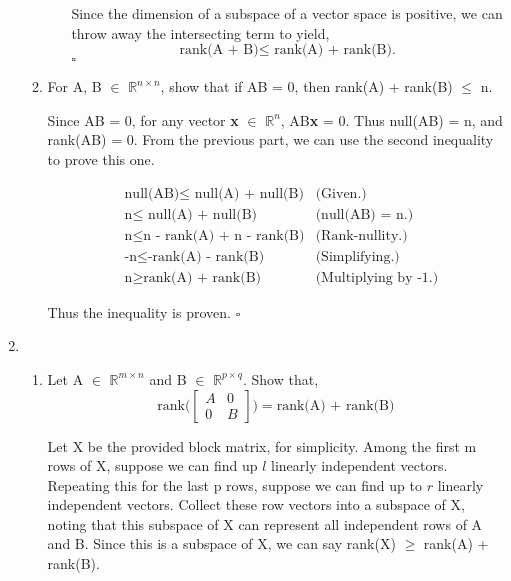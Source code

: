 \documentclass[12pt]{article}
\newcommand{\hop}{\vspace{1mm}}
\newcommand{\jump}{\vspace{5mm}}
\newcommand{\R}{\mathbb{R}}
\begin{document}
\begin{enumerate}[leftmargin=\labelsep]
\begin{enumerate}
\begin{enumerate}
        Since the dimension of a subspace of a vector space is positive, we can throw away the intersecting term to yield,
        \[
        \text{rank(A + B)} \leq \text{ rank(A) + rank(B).}
        \]
        $\square$
    \end{enumerate}

    \hop
    \item For A, B $\in$ $\R^{n \times n}$, show that if AB = 0, then rank(A) + rank(B) $\leq$ n.
    \jump

    Since AB = 0, for any vector \textbf{x} $\in$ $\R^n$, AB\textbf{x} = 0. Thus null(AB) = n, and rank(AB) = 0. From the previous part, we can use the second inequality to prove this one.

    \begin{align*}
        &\text{null(AB)} \leq \text{ null(A) + null(B)} &\text{(Given.)}    \\
        &\text{n} \leq \text{ null(A) + null(B)}    &\text{(null(AB) = n.)} \\
        &\text{n} \leq \text{n - rank(A) + n - rank(B)} &\text{(Rank-nullity.)} \\
        &\text{-n} \leq \text{-rank(A) - rank(B)}   &\text{(Simplifying.)} \\
        &\text{n} \geq \text{rank(A) + rank(B)} &\text{(Multiplying by -1.)}
    \end{align*}

    Thus the inequality is proven. $\square$
\end{enumerate}

\item 
\begin{enumerate}
\item Let A $\in$ $\R^{m \times n}$ and B $\in$ $\R^{p \times q}$. Show that,
\[
\text{rank} \Bigg(
\begin{bmatrix}
A & 0 \\
0 & B
\end{bmatrix}
\Bigg) = \text{rank(A) + rank(B)}
\]
\jump

Let X be the provided block matrix, for simplicity. Among the first m rows of X, suppose we can find up $l$ linearly independent vectors. Repeating this for the last p rows, suppose we can find up to $r$ linearly independent vectors. Collect these row vectors into a subspace of X, noting that this subspace of X can represent all independent rows of A and B. Since this is a subspace of X, we can say rank(X) $\geq$ rank(A) + rank(B).


\end{enumerate}
\end{enumerate}
\end{document}
